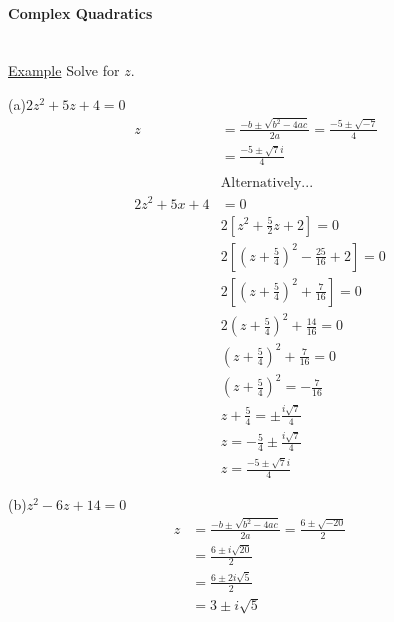 \documentclass[a4paper]{article}
\begin{document}
				\paragraph{Complex Quadratics}\mbox{}\\
					\underline{Example}\newline
					Solve for $z$.\newline
					\begin{minipage}[t]{0.5\textwidth}
						(a)$2z^2+5z+4=0$
						\begin{align*}
							z&=\frac{-b\pm\sqrt{b^2-4ac}}{2a}=\frac{-5\pm\sqrt{-7}}{4}\\
							&=\frac{-5\pm\sqrt{7}i}{4} \\\\
							&\text{Alternatively...}\\
							2z^2+5x+4&=0 \\
							&2\left[z^2+\frac{5}{2}z+2\right]=0 \\
							&2\left[\left(z+\frac{5}{4}\right)^2-\frac{25}{16}+2\right]=0\\
							&2\left[\left(z+\frac{5}{4}\right)^2+\frac{7}{16}\right]=0\\
							&2\left(z+\frac{5}{4}\right)^2+\frac{14}{16}=0 \\
							&\left(z+\frac{5}{4}\right)^2+\frac{7}{16}=0 \\
							&\left(z+\frac{5}{4}\right)^2=-\frac{7}{16} \\
							&z+\frac{5}{4}=\pm\frac{i\sqrt{7}}{4} \\
							&z=-\frac{5}{4}\pm\frac{i\sqrt{7}}{4} \\
							&z=\frac{-5\pm\sqrt{7}i}{4}
						\end{align*}
					\end{minipage}
					\hfill
					\begin{minipage}{0.5\textwidth}
						(b)$z^2-6z+14=0$
						\begin{align*}
							z&=\frac{-b\pm\sqrt{b^2-4ac}}{2a}=\frac{6\pm\sqrt{-20}}{2} \\
							&=\frac{6\pm i\sqrt{20}}{2} \\
							&=\frac{6\pm2i\sqrt{5}}{2} \\
							&=3\pm i\sqrt{5}
						\end{align*}
					\end{minipage}
				\newpage
\end{document}
